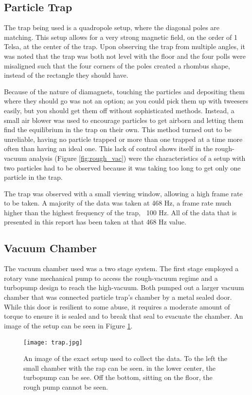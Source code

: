 \documentclass[12pt]{article}
\begin{document}
\subsection{Particle Trap}
The trap being used is a quadropole setup, where the diagonal poles are matching. This setup allows for a very strong magnetic field, on the order of 1 Telsa, at the center of the trap. Upon observing the trap from multiple angles, it was noted that the trap was both not level with the floor and the four polls were misaligned such that the four corners of the poles created a rhombus shape, instead of the rectangle they should have.

Because of the nature of diamagnets, touching the particles and depositing them where they should go was not an option; as you could pick them up with tweesers easily, but you should get them off without sophisticated methods. Instead, a small air blower was used to encourage particles to get airborn and letting them find the equilibrium in the trap on their own. This method turned out to be unreliable, having no particle trapped or more than one trapped at a time more often than having an ideal one. This lack of control shows itself in the rough-vacuum analysis (Figure \ref{fig:rough_vac}) were the characteristics of a setup with two particles had to be observed because it was taking too long to get only one particle in the trap. 

The trap was observed with a small viewing window, allowing a high frame rate to be taken. A majority of the data was taken at 468 Hz, a frame rate much higher than the highest frequency of the trap, ~100 Hz. All of the data that is presented in this report has been taken at that 468 Hz value. 

\subsection{Vacuum Chamber}
The vacuum chamber used was a two stage system. The first stage employed a rotary vane mechanical pump to access the rough-vacuum regime and a turbopump design to reach the high-vacuum. Both pumped out a larger vacuum chamber that was connected particle trap's chamber by a metal sealed door. While this door is resilient to some abuse, it requires a moderate amount of torque to ensure it is sealed and to break that seal to evacuate the chamber. An image of the setup can be seen in Figure \ref{fig:trap}.
\begin{figure}
\texttt{[image: trap.jpg]}\
\caption{An image of the exact setup used to collect the data. To the left the small chamber with the rap can be seen. in the lower center, the turbopump can be see. Off the bottom, sitting on the floor, the rough pump cannot be seen.}
\label{fig:trap}
\end{figure}
\end{document}
